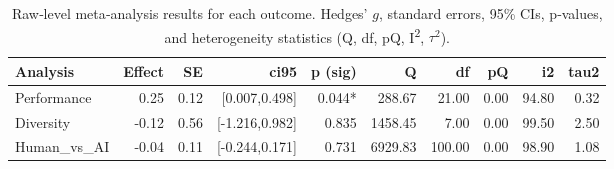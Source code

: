 \begin{table}[ht]
\centering
\begin{tabular}{lrrrrrrrrr}
  \toprule
Analysis & Effect & SE & ci95 & p (sig) & Q & df & pQ & i2 & tau2 \\ 
  \midrule
Performance & 0.25 & 0.12 & [0.007,0.498] & 0.044* & 288.67 & 21.00 & 0.00 & 94.80 & 0.32 \\ 
  Diversity & -0.12 & 0.56 & [-1.216,0.982] & 0.835 & 1458.45 & 7.00 & 0.00 & 99.50 & 2.50 \\ 
  Human_vs_AI & -0.04 & 0.11 & [-0.244,0.171] & 0.731 & 6929.83 & 100.00 & 0.00 & 98.90 & 1.08 \\ 
   \bottomrule
\end{tabular}
\caption{Raw‐level meta‐analysis results for each outcome. Hedges’ $g$, standard errors, 95\% CIs, p‐values, and heterogeneity statistics (Q, df, pQ, I\textsuperscript{2}, $\tau^2$).} 
\label{tab:meta_raw}
\end{table}
